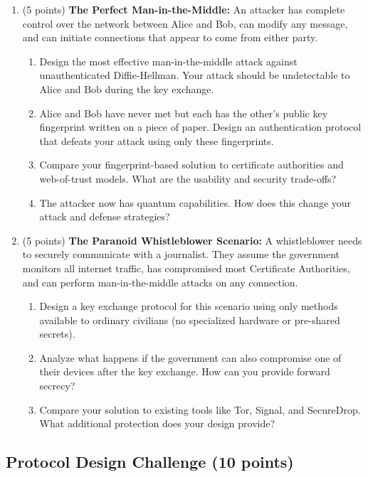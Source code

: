 \documentclass[10pt,a4paper,american]{article}
\begin{document}
\begin{enumerate}
	\item (5 points) \textbf{The Perfect Man-in-the-Middle:}
	      An attacker has complete control over the network between Alice and Bob, can modify any message, and can initiate connections that appear to come from either party.
	      \begin{enumerate}
		      \item Design the most effective man-in-the-middle attack against unauthenticated Diffie-Hellman. Your attack should be undetectable to Alice and Bob during the key exchange.
		      \item Alice and Bob have never met but each has the other's public key fingerprint written on a piece of paper. Design an authentication protocol that defeats your attack using only these fingerprints.
		      \item Compare your fingerprint-based solution to certificate authorities and web-of-trust models. What are the usability and security trade-offs?
		      \item The attacker now has quantum capabilities. How does this change your attack and defense strategies?
	      \end{enumerate}
	\item (5 points) \textbf{The Paranoid Whistleblower Scenario:}
	      A whistleblower needs to securely communicate with a journalist. They assume the government monitors all internet traffic, has compromised most Certificate Authorities, and can perform man-in-the-middle attacks on any connection.
	      \begin{enumerate}
		      \item Design a key exchange protocol for this scenario using only methods available to ordinary civilians (no specialized hardware or pre-shared secrets).
		      \item Analyze what happens if the government can also compromise one of their devices after the key exchange. How can you provide forward secrecy?
		      \item Compare your solution to existing tools like Tor, Signal, and SecureDrop. What additional protection does your design provide?
	      \end{enumerate}
\end{enumerate}

\subsection{Protocol Design Challenge (10 points)}
\end{document}
